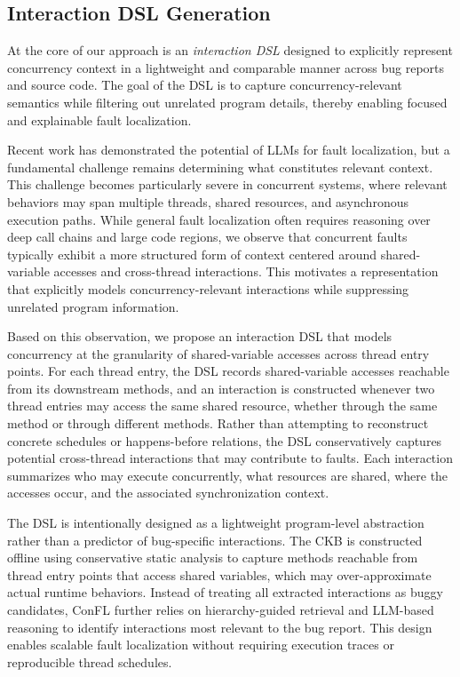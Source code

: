 \subsection{Interaction DSL Generation}
\label{sec:interaction-dsl}

At the core of our approach is an \emph{interaction DSL} designed to explicitly represent concurrency context in a lightweight and comparable manner across bug reports and source code. The goal of the DSL is to capture concurrency-relevant semantics while filtering out unrelated program details, thereby enabling focused and explainable fault localization.

Recent work has demonstrated the potential of LLMs for fault localization, but a fundamental challenge remains determining what constitutes relevant context. This challenge becomes particularly severe in concurrent systems, where relevant behaviors may span multiple threads, shared resources, and asynchronous execution paths. While general fault localization often requires reasoning over deep call chains and large code regions, we observe that concurrent faults typically exhibit a more structured form of context centered around shared-variable accesses and cross-thread interactions. This motivates a representation that explicitly models concurrency-relevant interactions while suppressing unrelated program information.



Based on this observation, we propose an interaction DSL that models concurrency at the granularity of shared-variable accesses across thread entry points. For each thread entry, the DSL records shared-variable accesses reachable from its downstream methods, and an interaction is constructed whenever two thread entries may access the same shared resource, whether through the same method or through different methods. Rather than attempting to reconstruct concrete schedules or happens-before relations, the DSL conservatively captures potential cross-thread interactions that may contribute to faults. Each interaction summarizes who may execute concurrently, what resources are shared, where the accesses occur, and the associated synchronization context.

The DSL is intentionally designed as a lightweight program-level abstraction rather than a predictor of bug-specific interactions. The CKB is constructed offline using conservative static analysis to capture methods reachable from thread entry points that access shared variables, which may over-approximate actual runtime behaviors. Instead of treating all extracted interactions as buggy candidates, ConFL further relies on hierarchy-guided retrieval and LLM-based reasoning to identify interactions most relevant to the bug report. This design enables scalable fault localization without requiring execution traces or reproducible thread schedules.

